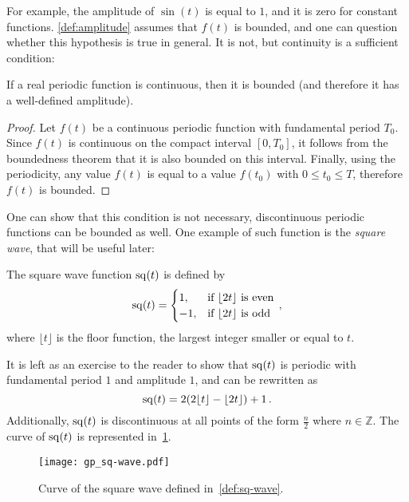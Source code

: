 \noindent For example, the amplitude of $\sin(t)$ is equal to $1$, and it is zero for
constant functions. \cref{def:amplitude} assumes that $f(t)$ is bounded, and one can
question whether this hypothesis is true in general. It is not, but continuity is a
sufficient condition:
\begin{proposition}
  If a real periodic function is continuous, then it is bounded (and therefore it has a
  well-defined amplitude).
\end{proposition}
\begin{proof}
  Let $f(t)$ be a continuous periodic function with fundamental period $T_0$. Since $f(t)$
  is continuous on the compact interval $[0,T_0]$, it follows from the boundedness theorem
  that it is also bounded on this interval. Finally, using the periodicity, any value
  $f(t)$ is equal to a value $f(t_0)$ with $0\leq t_0\leq T$, therefore $f(t)$ is bounded.
\end{proof}
\noindent One can show that this condition is not necessary, \ie discontinuous periodic
functions can be bounded as well. One example of such function is the \emph{square wave},
that will be useful later:
\begin{definition}
  \label{def:sq-wave}
  The square wave function $\mathrm{sq}(t)$ is defined by
  \begin{equation}
    \mathrm{sq}(t)=
    \begin{cases}
      1, &\text{if~}\lfloor 2t\rfloor~\text{is even}\\
      -1, &\text{if~}\lfloor 2t\rfloor~\text{is odd}\\
    \end{cases}\,,
  \end{equation}
  where $\lfloor t\rfloor$ is the floor function, \ie the largest integer smaller or equal
  to $t$.
\end{definition}
\noindent It is left as an exercise to the reader to show that $\mathrm{sq}(t)$ is periodic with
fundamental period $1$ and amplitude $1$, and can be rewritten as
\begin{equation}
  \mathrm{sq}(t)=2(2\lfloor t\rfloor-\lfloor 2t\rfloor)+1\,.
\end{equation}
Additionally, $\mathrm{sq}(t)$ is discontinuous at all points of the form $\frac{n}{2}$ where
$n\in\mathbb{Z}$. The curve of $\mathrm{sq}(t)$ is represented in~\cref{fig:sq-wave}.
\begin{figure}[t]
  \centering
  \texttt{[image: gp\_sq-wave.pdf]}
  \caption{Curve of the square wave defined in~\cref{def:sq-wave}.}
  \label{fig:sq-wave}
\end{figure}

